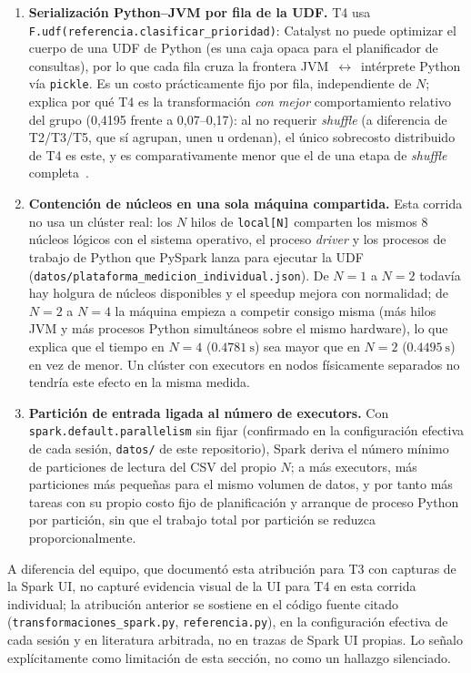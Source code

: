 \documentclass[11pt,a4paper]{article}
\begin{document}
\begin{enumerate}
\item \textbf{Serialización Python--JVM por fila de la UDF.} T4 usa
\texttt{F.udf(referencia.clasificar\_prioridad)}: Catalyst no puede optimizar el cuerpo de una
UDF de Python (es una caja opaca para el planificador de consultas), por lo que cada fila cruza
la frontera JVM~\(\leftrightarrow\)~intérprete Python vía \texttt{pickle}. Es un costo
prácticamente fijo por fila, independiente de \(N\); explica por qué T4 es la transformación
\emph{con mejor} comportamiento relativo del grupo (0,4195 frente a 0,07--0,17): al no requerir
\emph{shuffle} (a diferencia de T2/T3/T5, que sí agrupan, unen u ordenan), el único sobrecosto
distribuido de T4 es este, y es comparativamente menor que el de una etapa de \emph{shuffle}
completa~\cite{duenner2017understanding}.
\item \textbf{Contención de núcleos en una sola máquina compartida.} Esta corrida no usa un
clúster real: los \(N\) hilos de \texttt{local[N]} comparten los mismos 8 núcleos lógicos con
el sistema operativo, el proceso \emph{driver} y los procesos de trabajo de Python que PySpark
lanza para ejecutar la UDF (\texttt{datos/plataforma\_medicion\_individual.json}). De \(N=1\) a
\(N=2\) todavía hay holgura de núcleos disponibles y el speedup mejora con normalidad; de
\(N=2\) a \(N=4\) la máquina empieza a competir consigo misma (más hilos JVM y más procesos
Python simultáneos sobre el mismo hardware), lo que explica que el tiempo en \(N=4\)
(\(\SI{0.4781}{\second}\)) sea mayor que en \(N=2\) (\(\SI{0.4495}{\second}\)) en vez de menor.
Un clúster con executors en nodos físicamente separados no tendría este efecto en la misma
medida.
\item \textbf{Partición de entrada ligada al número de executors.} Con
\texttt{spark.default.parallelism} sin fijar (confirmado en la configuración efectiva de cada
sesión, \texttt{datos/} de este repositorio), Spark deriva el número mínimo de particiones de
lectura del CSV del propio \(N\); a más executors, más particiones más pequeñas para el mismo
volumen de datos, y por tanto más tareas con su propio costo fijo de planificación y arranque de
proceso Python por partición, sin que el trabajo total por partición se reduzca proporcionalmente.
\end{enumerate}

A diferencia del equipo, que documentó esta atribución para T3 con capturas de la Spark UI, no
capturé evidencia visual de la UI para T4 en esta corrida individual; la atribución anterior se
sostiene en el código fuente citado (\texttt{transformaciones\_spark.py}, \texttt{referencia.py}),
en la configuración efectiva de cada sesión y en literatura arbitrada, no en trazas de Spark UI
propias. Lo señalo explícitamente como limitación de esta sección, no como un hallazgo silenciado.
\end{document}
